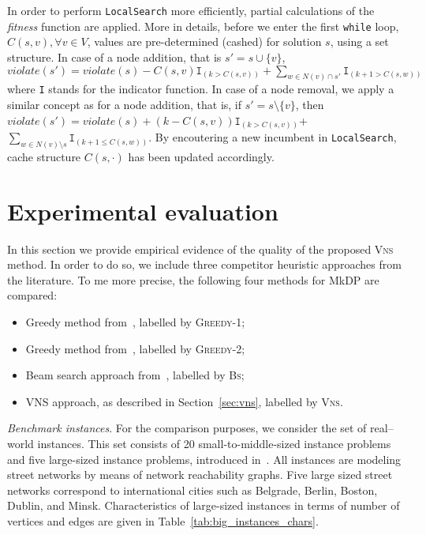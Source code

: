 \documentclass[sigconf]{acmart}
\begin{document}
In order to perform \texttt{LocalSearch} more efficiently, partial calculations of the \emph{fitness} function are applied. More in details, before we enter the first \texttt{while} loop, $C(s, v), \forall v \in V$, values are pre-determined (cashed) for solution $s$, using a set structure. In case of a node addition, that is  $s' = s \cup \{v\} $, $violate(s') = violate(s) - C(s, v)  \texttt{I}_{(k> C(s,v))}  + \sum_{w\in N(v) \cap s'} \texttt{I}_{(k+1 > C(s, w))}  $ where \texttt{I} stands for the indicator function. 
In case of a node removal, we apply a similar concept as for a node addition, that is, if $s' = s \setminus \{v\}$, then $violate(s') =  violate(s) + ( k - C(s, v)) \texttt{I}_{( k > C(s, v))} $+ $\sum_{ w \in   N(v)  \setminus s} \texttt{I}_{(k+1 \leq C(s, w)) }$. By encoutering a new incumbent in \texttt{LocalSearch}, cache structure $C(s, \cdot)$ has been updated accordingly.


\section{Experimental evaluation}\label{sec:experiments}


In this section we provide empirical evidence of the quality of the proposed \textsc{Vns} method. In order to do so, we include three competitor heuristic approaches from the literature. To me more precise, the following four methods for MkDP are compared:  

\begin{itemize}
	\item Greedy method from~\cite{parekh1991analysis,gagarin2013randomized}, labelled by \textsc{Greedy-1};
	\item Greedy method from~\cite{gagarin2018multiple}, labelled by \textsc{Greedy-2};
	\item Beam search approach from~\cite{corcoran2021heuristics}, labelled by \textsc{Bs};
	\item VNS approach, as described in Section~\ref{sec:vns}, labelled by \textsc{Vns}.  
\end{itemize}


\emph{Benchmark instances}. For the comparison purposes, we consider the set of real--world instances. This set consists of 20 small-to-middle-sized instance problems and five large-sized instance problems, introduced in~\cite{corcoran2021heuristics}. All instances are  modeling street networks by means of network reachability graphs. Five large sized street networks correspond to international cities such as Belgrade, Berlin, Boston, Dublin, and Minsk.
 Characteristics of large-sized instances in terms of number of vertices and edges are given in Table~\ref{tab:big_instances_chars}. 
 
\end{document}
